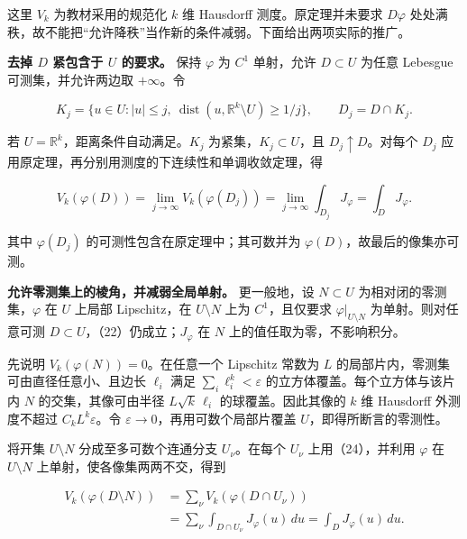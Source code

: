 \documentclass[11pt,a4paper]{article}
\begin{document}
这里 \(V_k\) 为教材采用的规范化 \(k\) 维 Hausdorff 测度。原定理并未要求
\(D\varphi\)
处处满秩，故不能把``允许降秩''当作新的条件减弱。下面给出两项实际的推广。

\textbf{去掉 \(D\) 紧包含于 \(U\) 的要求。} 保持 \(\varphi\) 为 \(C^1\)
单射，允许 \(D\subset U\) 为任意 Lebesgue 可测集，并允许两边取
\(+\infty\)。令

\begin{equation}
K_j=\{u\in U:|u|\le j,\ \operatorname{dist}(u,\mathbb R^k\setminus U)\ge1/j\},
\qquad D_j=D\cap K_j.
\tag{23}
\end{equation}

若 \(U=\mathbb R^k\)，距离条件自动满足。\(K_j\)
为紧集，\(K_j\subset U\)，且 \(D_j\uparrow D\)。对每个 \(D_j\)
应用原定理，再分别用测度的下连续性和单调收敛定理，得

\begin{equation}
V_k(\varphi(D))
=\lim_{j\to\infty}V_k(\varphi(D_j))
=\lim_{j\to\infty}\int_{D_j}J_\varphi
=\int_DJ_\varphi.
\tag{24}
\end{equation}

其中 \(\varphi(D_j)\) 的可测性包含在原定理中；其可数并为
\(\varphi(D)\)，故最后的像集亦可测。

\textbf{允许零测集上的棱角，并减弱全局单射。} 更一般地，设
\(N\subset U\) 为相对闭的零测集，\(\varphi\) 在 \(U\) 上局部
Lipschitz，在 \(U\setminus N\) 上为 \(C^1\)，且仅要求
\(\varphi|_{U\setminus N}\) 为单射。则对任意可测
\(D\subset U\)，（22）仍成立；\(J_\varphi\) 在 \(N\)
上的值任取为零，不影响积分。

先说明 \(V_k(\varphi(N))=0\)。在任意一个 Lipschitz 常数为 \(L\)
的局部片内，零测集可由直径任意小、且边长 \(\ell_i\) 满足
\(\sum_i\ell_i^k<\varepsilon\) 的立方体覆盖。每个立方体与该片内 \(N\)
的交集，其像可由半径 \(L\sqrt{k}\,\ell_i\) 的球覆盖。因此其像的 \(k\) 维
Hausdorff 外测度不超过 \(C_kL^k\varepsilon\)。令
\(\varepsilon\to0\)，再用可数个局部片覆盖 \(U\)，即得所断言的零测性。

将开集 \(U\setminus N\) 分成至多可数个连通分支 \(U_\nu\)。在每个
\(U_\nu\) 上用（24），并利用 \(\varphi\) 在 \(U\setminus N\)
上单射，使各像集两两不交，得到

\begin{equation}
\begin{aligned}
V_k(\varphi(D\setminus N))
&=\sum_\nu V_k(\varphi(D\cap U_\nu))\\
&=\sum_\nu\int_{D\cap U_\nu}J_\varphi(u)\,du
=\int_DJ_\varphi(u)\,du.
\end{aligned}
\tag{25}
\end{equation}
\end{document}
